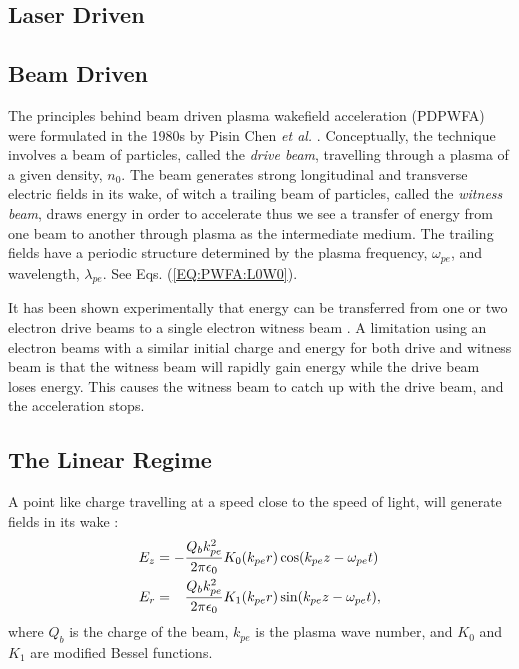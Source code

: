 

\subsection{Laser Driven}
\label{Int:LWFA}

\subsection{Beam Driven}
\label{Int:BDPWFA}

The principles behind beam driven plasma wakefield acceleration (PDPWFA) were formulated in the 1980s by Pisin Chen \emph{et al.} \cite{chen:1985}. Conceptually, the technique involves a beam of particles, called the \emph{drive beam}, travelling through a plasma of a given density, $n_{0}$. The beam generates strong longitudinal and transverse electric fields in its wake, of witch a trailing beam of particles, called the \emph{witness beam}, draws energy in order to accelerate \dash thus we see a transfer of energy from one beam to another through plasma as the intermediate medium. The trailing fields have a periodic structure determined by the plasma frequency, $\omega_{pe}$, and wavelength, $\lambda_{pe}$. See Eqs. (\ref{EQ:PWFA:L0W0}).

It has been shown experimentally that energy can be transferred from one or two electron drive beams to a single electron witness beam \cite{rosenzweig:1988, blumenfeld:2007, kallos:2008, litos:2014}. A limitation using an electron beams with a similar initial charge and energy for both drive and witness beam is that the witness beam will rapidly gain energy while the drive beam loses energy. This causes the witness beam to catch up with the drive beam, and the acceleration stops. 

\subsection{The Linear Regime}
\label{Int:PWFA:Lin}

A point like charge travelling at a speed close to the speed of light, will generate fields in its wake \cite{van_der_meer:1985,chen:1985}:
\begin{align}
    E_{z} &= -\frac{Q_{b}k_{pe}^{2}}{2\pi\epsilon_{0}} K_{0}(k_{pe}r)\cos(k_{pe}z - \omega_{pe}t) \label{EQ:PWFA:EZ} \\
    E_{r} &= \hphantom{-} \frac{Q_{b}k_{pe}^{2}}{2\pi\epsilon_{0}} K_{1}(k_{pe}r)\sin(k_{pe}z - \omega_{pe}t), \label{EQ:PWFA:ER}
\end{align}
where $Q_{b}$ is the charge of the beam, $k_{pe}$ is the plasma wave number, and $K_{0}$ and $K_{1}$ are modified Bessel functions. 

